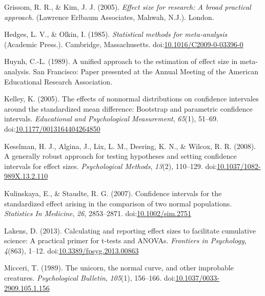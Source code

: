 \documentclass[
  man,floatsintext]{apa6}
\begin{document}
\leavevmode\hypertarget{ref-Grissom_and_kim_2005}{}%
Grissom, R. R., \& Kim, J. J. (2005). \emph{Effect size for research: A broad practical approach.} (Lawrence Erlbaum Associates, Mahwah, N.J.). London.

\leavevmode\hypertarget{ref-Hedges_Olkin_1985}{}%
Hedges, L. V., \& Olkin, I. (1985). \emph{Statistical methods for meta-analysis} (Academic Press.). Cambridge, Massachusetts. doi:\href{https://doi.org/10.1016/C2009-0-03396-0}{10.1016/C2009-0-03396-0}

\leavevmode\hypertarget{ref-Huynh_1989}{}%
Huynh, C.-L. (1989). A unified approach to the estimation of effect size in meta-analysis. San Francisco: Paper presented at the Annual Meeting of the American Educational Research Association.

\leavevmode\hypertarget{ref-Kelley_2005}{}%
Kelley, K. (2005). The effects of nonnormal distributions on confidence intervales around the standardized mean difference: Bootstrap and parametric confidence intervals. \emph{Educational and Psychological Measurement}, \emph{65}(1), 51--69. doi:\href{https://doi.org/10.1177/0013164404264850}{10.1177/0013164404264850}

\leavevmode\hypertarget{ref-Keselman_et_al_2008}{}%
Keselman, H. J., Algina, J., Lix, L. M., Deering, K. N., \& Wilcox, R. R. (2008). A generally robust approach for testing hypotheses and setting confidence intervals for effect sizes. \emph{Psychological Methods}, \emph{13}(2), 110--129. doi:\href{https://doi.org/10.1037/1082-989X.13.2.110}{10.1037/1082-989X.13.2.110}

\leavevmode\hypertarget{ref-Kulinskaya_Staudte_2007}{}%
Kulinskaya, E., \& Staudte, R. G. (2007). Confidence intervals for the standardized effect arising in the comparison of two normal populations. \emph{Statistics In Medicine}, \emph{26}, 2853--2871. doi:\href{https://doi.org/10.1002/sim.2751}{10.1002/sim.2751}

\leavevmode\hypertarget{ref-Lakens_2013}{}%
Lakens, D. (2013). Calculating and reporting effect sizes to facilitate cumulative science: A practical primer for t-tests and ANOVAs. \emph{Frontiers in Psychology}, \emph{4}(863), 1--12. doi:\href{https://doi.org/10.3389/fpsyg.2013.00863}{10.3389/fpsyg.2013.00863}

\leavevmode\hypertarget{ref-Micceri_1989}{}%
Micceri, T. (1989). The unicorn, the normal curve, and other improbable creatures. \emph{Psychological Bulletin}, \emph{105}(1), 156--166. doi:\href{https://doi.org/10.1037/0033-2909.105.1.156}{10.1037/0033-2909.105.1.156}
\end{document}
